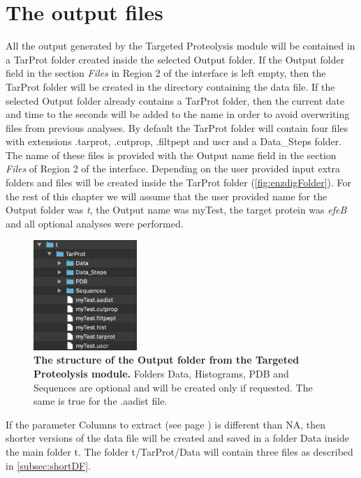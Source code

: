 \section{The output files}

All the output generated by the Targeted Proteolysis module will be contained in a TarProt folder created inside the selected Output folder. If the Output folder field in the section \textit{Files} in Region \num{2} of the interface is left empty, then the TarProt folder will be created in the directory containing the data file. If the selected Output folder already contains a TarProt folder, then the current date and time to the seconds will be added to the name in order to avoid overwriting files from previous analyses. By default the TarProt folder will contain four files with extensions .tarprot, .cutprop, .filtpept and uscr and a Data{\_}Steps folder. The name of these files is provided with the Output name field in the section \textit{Files} of Region \num{2} of the interface. Depending on the user provided input extra folders and files will be created inside the TarProt folder (\autoref{fig:enzdigFolder}). For the rest of this chapter we will assume that the user provided name for the Output folder was \textit{t}, the Output name was myTest, the target protein was \textit{efeB} and all optional analyses were performed.

\begin{figure}[h]
	\centering
	\includegraphics[width=0.35\textwidth]{./IMAGES/MOD-TARPROT/tarprot-files.jpg}	    
	\caption[The structure of the Output folder from the Targeted Proteolysis module]{\textbf{The structure of the Output folder from the Targeted Proteolysis module.} Folders Data, Histograms, PDB and Sequences are optional and will be created only if requested. The same is true for the .aadist file.} 
	\label{fig:enzdigFolder}
	\vspace{-5pt} 	
\end{figure} 

If the parameter Columns to extract (see page \pageref{par:enzdigColExt}) is different than NA, then shorter versions of the data file will be created and saved in a folder Data inside the main folder t. The folder t/TarProt/Data will\label{par:datafilesenzdig} contain three files as described in \autoref{subsec:shortDF}.


